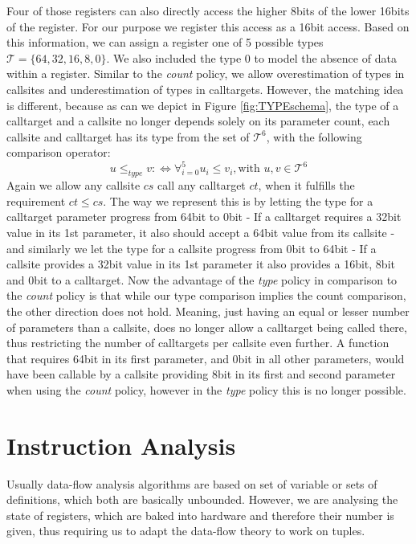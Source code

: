 Four of those registers can also directly access the higher 8bits of the lower 16bits of the register. For our purpose we register this access as a 16bit access. Based on this information, we can assign a register one of 5 possible types $\mathcal{T} = \{64, 32, 16, 8, 0\}$. We also included the type 0 to model the absence of data within a register. Similar to the \emph{count} policy, we allow overestimation of types in callsites and underestimation of types in calltargets. However, the matching idea is different, 
because as can we depict in Figure \ref{fig:TYPEschema}, the type of a calltarget and a callsite no longer depends solely on its parameter count, each callsite and calltarget has its type from the set of $\mathcal{T}^6$, with the following comparison operator:
\[
	u \leq_{type} v :\Longleftrightarrow  \forall_{i = 0}^{5} {u_i \leq v_i} , \text {with } u, v \in \mathcal{T}^6
\]
Again we allow any callsite $cs$ call any calltarget $ct$, when it fulfills the requirement $ct \leq cs$. The way we represent this is by letting the type for a calltarget parameter progress from 64bit to 0bit - If a calltarget requires a 32bit value in its 1st parameter, it also should accept a 64bit value from its callsite - and similarly we let the type for a callsite progress from 0bit to 64bit - If a callsite provides a 32bit value in its 1st parameter it also provides a 16bit, 8bit and 0bit to a calltarget. Now the advantage of the \emph{type} policy in comparison to the \emph{count} policy is that while our type comparison implies the count comparison, the other direction does not hold. Meaning, just having an equal or lesser number of parameters than a callsite, does no longer allow a calltarget being called there, thus restricting the number of calltargets per callsite even further. A function that requires 64bit in its first parameter, and 0bit in all other parameters, would have been callable by a callsite providing 8bit in its first and second parameter when using the \emph{count} policy, however in the \emph{type} policy this is no longer possible.


\section{Instruction Analysis}
\label{section:instructionanalysis}
Usually data-flow analysis algorithms are based on set of variable or sets of definitions, which both are basically unbounded. However, we are analysing the state of registers, which are baked into hardware and therefore their number is given, thus requiring us to adapt the data-flow theory to work on tuples.

